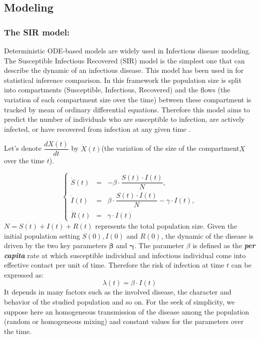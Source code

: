 \documentclass[nonatbib,preprint,12pt,authoryear]{elsarticle}
\begin{document}
\subsection{Modeling}
\subsubsection{The SIR model:}
Deterministic ODE-based models are widely used in Infectious disease modeling. The Susceptible Infectious Recovered (SIR) model is the simplest one that can describe the dynamic of an infectious disease. This model has been used in \cite{chatzilena_contemporary_2019} for statistical inference comparison. In this framework the population size is split into compartments (Susceptible, Infectious, Recovered) and the flows (the variation of each compartment size over the time) between these compartment is tracked by mean of ordinary differential equations. Therefore this model aims to predict the number of individuals who are susceptible to infection, are actively infected, or have recovered from infection at any given time \cite{bjornstad_on_modeling_2020}.

Let's denote $\dfrac{dX(t)}{dt}$ by $\Dot{X}(t)$(the variation of the size of the compartment$X$ over the time $t$).

\begin{equation}
    \label{eq:SIR_article}
    \left\{\begin{array}{rcl} 
        \Dot{S}(t) &=& -\beta \cdot \dfrac{S(t) \cdot I(t)}{N}, \\
        \Dot{I}(t) &=& \beta \cdot \dfrac{S(t) \cdot I(t)}{N} - \gamma \cdot I(t), \\
        \Dot{R}(t) &=& \gamma \cdot I(t)
    \end{array}\right.
    \end{equation}
$N = S(t) + I(t) + R(t)$ represents the total population size. Given the initial population setting $S(0), I(0)$ and $R(0)$, the dynamic of the disease is driven by the two key parameters $\mathbf{\beta}$ and $\mathbf{\gamma}$.
The parameter $\beta$ is defined as the \textit{\textbf{per capita}} rate at which susceptible individual and infectious individual come into effective contact per unit of time\cite{vynnycky2010introduction}. 
Therefore the risk of infection at time $t$ can be expressed as:
$$ \lambda(t) = \beta \cdot I(t)$$
It depends in many factors such as the involved disease, the character and  behavior of the studied population and so on. For the seek of simplicity, we suppose here an homogeneous transmission of the disease among the population (random or homogeneous mixing) and constant values for the parameters over the time.
\end{document}

